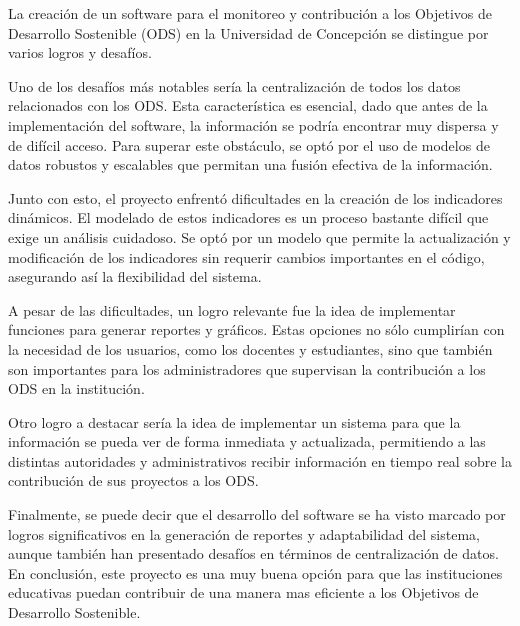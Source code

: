 \documentclass[12pt]{article}
\begin{document}
La creación de un software para el monitoreo y contribución a los Objetivos de Desarrollo Sostenible (ODS) en la Universidad de Concepción se distingue por varios logros y desafíos. 

Uno de los desafíos más notables sería la centralización de todos los datos relacionados con los ODS. Esta característica es esencial, dado que antes de la implementación del software, la información se podría encontrar muy dispersa y de difícil acceso. Para superar este obstáculo, se optó por el uso de modelos de datos robustos y escalables que permitan una fusión efectiva de la información.

Junto con esto, el proyecto enfrentó dificultades en la creación de los indicadores dinámicos. El modelado de estos indicadores es un proceso bastante difícil que exige un análisis cuidadoso. Se optó por un modelo que permite la actualización y modificación de los indicadores sin requerir cambios importantes en el código, asegurando así la flexibilidad del sistema.

A pesar de las dificultades, un logro relevante fue la idea de implementar funciones para generar reportes y gráficos. Estas opciones no sólo cumplirían con la necesidad de los usuarios, como los docentes y estudiantes, sino que también son importantes para los administradores que supervisan la contribución a los ODS en la institución.

Otro logro a destacar sería la idea de implementar un sistema para que la información se pueda ver de forma inmediata y actualizada, permitiendo a las distintas autoridades y administrativos recibir información en tiempo real sobre la contribución de sus proyectos a los ODS.

Finalmente, se puede decir que el desarrollo del software se ha visto marcado por logros significativos en la generación de reportes y adaptabilidad del sistema, aunque también han presentado desafíos en términos de centralización de datos. En conclusión, este proyecto es una muy buena opción para que las instituciones educativas puedan contribuir de una manera mas eficiente a los Objetivos de Desarrollo Sostenible.
\end{document}
